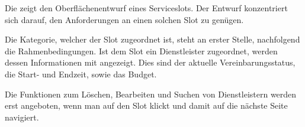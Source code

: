 Die  zeigt den Oberflächenentwurf eines Serviceslots. Der Entwurf konzentriert sich darauf, den Anforderungen an einen solchen Slot zu genügen.

Die Kategorie, welcher der Slot zugeordnet ist, steht an erster Stelle, nachfolgend die Rahmenbedingungen. Ist dem Slot ein Dienstleister zugeordnet, werden dessen Informationen mit angezeigt. Dies sind der aktuelle Vereinbarungsstatus, die Start- und Endzeit, sowie das Budget.




Die Funktionen zum Löschen, Bearbeiten und Suchen von Dienstleistern werden erst angeboten, wenn man auf den Slot klickt und damit auf die nächste Seite navigiert.
